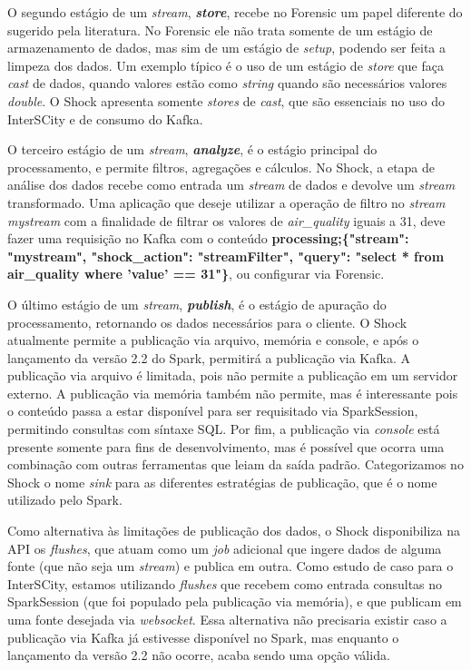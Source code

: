 O segundo estágio de um \textit{stream}, \textit{\textbf{store}}, recebe no
Forensic um papel diferente do sugerido pela literatura. No Forensic
ele não trata somente de um estágio de armazenamento de dados, mas sim de um
estágio de \textit{setup}, podendo ser feita a limpeza dos dados. Um
exemplo típico é o uso de um estágio de \textit{store} que faça \textit{cast}
de dados, quando valores estão como \textit{string} quando são necessários valores
\textit{double}. O Shock apresenta somente \textit{stores} de \textit{cast},
que são essenciais no uso do InterSCity e de consumo do Kafka.



O terceiro estágio de um \textit{stream}, \textit{\textbf{analyze}}, é o
estágio principal do processamento, e permite filtros, agregações e cálculos.
No Shock, a etapa de análise dos dados recebe como entrada um \textit{stream}
de dados e devolve um \textit{stream} transformado. Uma aplicação que deseje
utilizar a operação de filtro no \textit{stream} \textit{mystream} com a finalidade
de filtrar os valores de \textit{air\_quality} iguais a 31, deve fazer uma
requisição no Kafka com o conteúdo \small{\textbf{processing;\{"stream": "mystream",
"shock\_action": "streamFilter", "query": "select * from air\_quality where
'value' == 31"\}}}, ou configurar via Forensic.



O último estágio de um \textit{stream}, \textit{\textbf{publish}}, é o estágio
de apuração do processamento, retornando os dados necessários para o cliente.
O Shock atualmente permite a publicação via arquivo, memória e console, e após o
lançamento da versão 2.2 do Spark, permitirá a publicação via Kafka. A
publicação via arquivo é limitada, pois não permite a publicação em um servidor
externo. A publicação via memória também não permite, mas é interessante pois
o conteúdo passa a estar disponível para ser requisitado via SparkSession,
permitindo consultas com síntaxe SQL. Por fim, a publicação via \textit{console} está
presente somente para fins de desenvolvimento, mas é possível que ocorra uma
combinação com outras ferramentas que leiam da saída padrão. Categorizamos
no Shock o nome \textit{sink} para as diferentes estratégias de publicação,
que é o nome utilizado pelo Spark.



Como alternativa às limitações de publicação dos dados, o Shock disponibiliza
na API os \textit{flushes}, que atuam como um \textit{job} adicional que ingere
dados de alguma fonte (que não seja um \textit{stream}) e publica em outra.
Como estudo de caso para o InterSCity, estamos utilizando \textit{flushes} que
recebem como entrada consultas no SparkSession (que foi populado pela
publicação via memória), e que publicam em uma fonte desejada via
\textit{websocket}. Essa alternativa não precisaria existir caso
a publicação via Kafka já estivesse disponível no Spark, mas enquanto o
lançamento da versão 2.2 não ocorre, acaba sendo uma opção válida.
